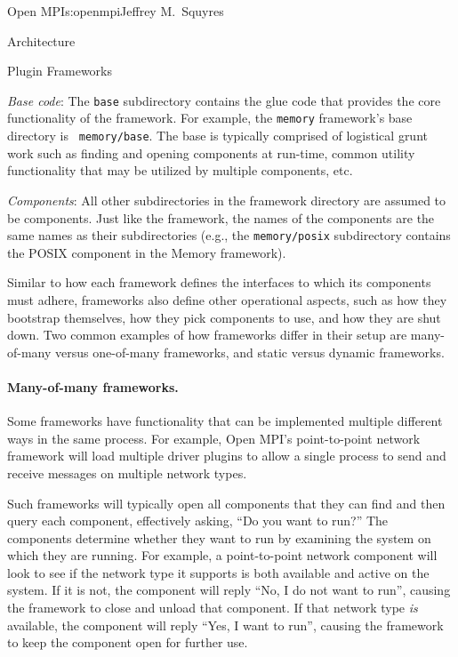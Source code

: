 \begin{aosachapter}{Open MPI}{s:openmpi}{Jeffrey M.\ Squyres}
\begin{aosasect1}{Architecture}
\begin{aosasect2}{Plugin Frameworks}
\begin{aosaenumerate}
\item \emph{Base code}: The {\tt base} subdirectory contains the glue
  code that provides the core functionality of the framework.  For
  example, the {\tt memory} framework's base directory is {\tt
    memory/base}.  The base is typically comprised of logistical grunt
  work such as finding and opening components at run-time, common
  utility functionality that may be utilized by multiple components,
  etc.

\item \emph{Components}: All other subdirectories in the framework
  directory are assumed to be components.  Just like the framework,
  the names of the components are the same names as their
  subdirectories (e.g., the {\tt memory/posix} subdirectory contains
  the POSIX component in the Memory framework).
\end{aosaenumerate}

Similar to how each framework defines the interfaces to which its
components must adhere, frameworks also define other operational
aspects, such as how they bootstrap themselves, how they pick
components to use, and how they are shut down.  Two common examples of
how frameworks differ in their setup are many-of-many versus one-of-many
frameworks, and static versus dynamic frameworks.


\paragraph{Many-of-many frameworks.} 

Some frameworks have functionality that can be implemented multiple
different ways in the same process.
%
For example, Open MPI's point-to-point network framework will load
multiple driver plugins to allow a single process to send and receive
messages on multiple network types.

Such frameworks will typically open all components that they can find
and then query each component, effectively asking, ``Do you want to
run?''  
%
The components determine whether they want to run by examining the
system on which they are running.
%
For example, a point-to-point network component will look to see if
the network type it supports is both available and active on the
system.
%
If it is not, the component will reply ``No, I do not want to run'',
causing the framework to close and unload that component.
% 
If that network type \emph{is} available, the component will reply
``Yes, I want to run'', causing the framework to keep the component
open for further use.


\end{aosasect2}
\end{aosasect1}
\end{aosachapter}
